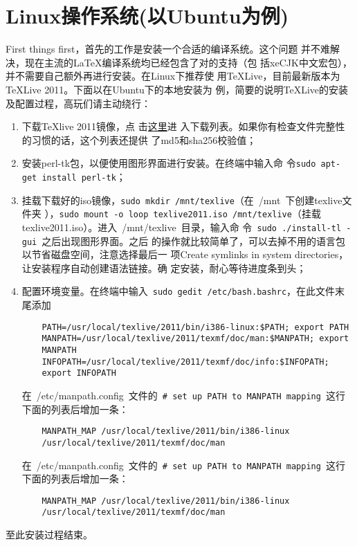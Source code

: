 \section{Linux操作系统(以Ubuntu为例)}
First things first，首先的工作是安装一个合适的\XeTeX{}编译系统。这个问题
并不难解决，现在主流的\LaTeX{}编译系统均已经包含了对\XeTeX{}的支持（包
括xeCJK中文宏包），并不需要自己额外再进行安装。在Linux下推荐使
用\TeX{}Live，目前最新版本为\TeX{}Live 2011。下面以在Ubuntu下的本地安装为
例，简要的说明\TeX{}Live的安装及配置过程，高玩们请主动绕行：
\begin{enumerate}
\item 下载\TeX{}live 2011镜像，点
  击\href{http://ftp.ctex.org/mirrors/CTAN/systems/texlive/Images/}{这里}进
  入下载列表。如果你有检查文件完整性的习惯的话，这个列表还提供
  了md5和sha256校验值；
\item 安装perl-tk包，以便使用图形界面进行安装。在终端中输入命
  令\texttt{\footnotesize sudo apt-get install perl-tk}；
\item 挂载下载好的iso镜像，\texttt{\footnotesize sudo mkdir
    /mnt/texlive}（在~{/mnt}~下创建texlive文件夹
  ），\texttt{\footnotesize sudo mount -o loop texlive2011.iso
    /mnt/texlive}（挂载texlive2011.iso）。进入~/mnt/texlive~目录，输入命
  令~\texttt{\footnotesize sudo ./install-tl -gui}~之后出现图形界面。之后
  的操作就比较简单了，可以去掉不用的语言包以节省磁盘空间，注意选择最后一
  项Create symlinks in system directories，让安装程序自动创建语法链接。确
  定安装，耐心等待进度条到头；
\item 配置环境变量。在终端中输入~\texttt{\footnotesize sudo gedit
    /etc/bash.bashrc}，在此文件末尾添加
  \begin{lstlisting}
    PATH=/usr/local/texlive/2011/bin/i386-linux:$PATH; export PATH
    MANPATH=/usr/local/texlive/2011/texmf/doc/man:$MANPATH; export
    MANPATH
    INFOPATH=/usr/local/texlive/2011/texmf/doc/info:$INFOPATH;
    export INFOPATH
  \end{lstlisting}
  在~{/etc/manpath.config}~文件的~\texttt{\footnotesize\# set up PATH to
    MANPATH mapping}~这行下面的列表后增加一条：
  \begin{lstlisting}
    MANPATH_MAP /usr/local/texlive/2011/bin/i386-linux
    /usr/local/texlive/2011/texmf/doc/man
  \end{lstlisting}
  在~{/etc/manpath.config}~文件的~\texttt{\footnotesize\# set up PATH to
    MANPATH mapping}~这行下面的列表后增加一条：
  \begin{lstlisting}
    MANPATH_MAP /usr/local/texlive/2011/bin/i386-linux
    /usr/local/texlive/2011/texmf/doc/man
  \end{lstlisting}
\end{enumerate}
至此安装过程结束。

